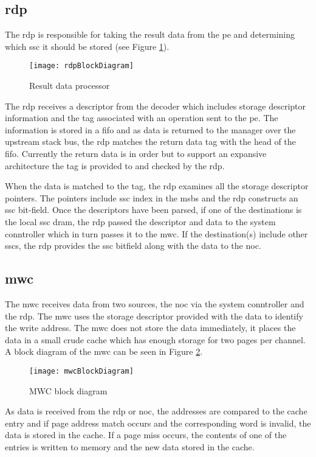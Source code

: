 \subsection{\Acf{rdp}}
\label{sec:RDP}
The \ac{rdp} is responsible for taking the result data from the \ac{pe} and determining which \ac{ssc} it should be stored (see Figure \ref{fig:RDP block diagram}).

\begin{figure}[h]
\centering
\captionsetup{justification=centering}
\captionsetup{width=.9\linewidth}
\centerline{
\mbox{\texttt{[image: rdpBlockDiagram]}}
}
\center\caption{Result data processor}
\label{fig:RDP block diagram}
\end{figure}

The \ac{rdp} receives a descriptor from the decoder which includes storage descriptor information and the tag associated with an operation sent to the \ac{pe}.
The information is stored in a \ac{fifo} and as data is returned to the manager over the upstream stack bus, the \ac{rdp} matches the return data tag with the head of the \ac{fifo}.
Currently the return data is in order but to support an expansive architecture the tag is provided to and checked by the \ac{rdp}.

When the data is matched to the tag, the \ac{rdp} examines all the storage descriptor pointers. The pointers include \ac{ssc} index in the \acp{msb} and the \ac{rdp} constructs an \ac{ssc} bit-field.
Once the descriptors have been parsed, if one of the destinations is the local \ac{ssc} \ac{dram}, the \ac{rdp} passed the descriptor and data to the system conntroller which in turn passes it to the \ac{mwc}.
If the destination(s) include other \acp{ssc}, the \ac{rdp} provides the \ac{ssc} bitfield along with the data to the \ac{noc}.


\subsection{\Acf{mwc}}
\label{sec:MWC}

The \acf{mwc} receives data from two sources, the \ac{noc} via the system conntroller and the \ac{rdp}.
The \ac{mwc} uses the storage descriptor provided with the data to identify the write address.
The \ac{mwc} does not store the data immediately, it places the data in a small crude cache which has enough storage for two pages per channel.
A block diagram of the \ac{mwc} can be seen in Figure \ref{fig:MWC block diagram}.
\begin{figure}[h]
\centering
\captionsetup{justification=centering}
\captionsetup{width=.9\linewidth}
\centerline{
\mbox{\texttt{[image: mwcBlockDiagram]}}
}
\center\caption{MWC block diagram}
\label{fig:MWC block diagram}
\end{figure}
As data is received from the \ac{rdp} or \ac{noc}, the addresses are compared to the cache entry and if page address match occurs and the corresponding word is invalid, the data is stored in the cache.
If a page miss occurs, the contents of one of the entries is written to memory and the new data stored in the cache.

